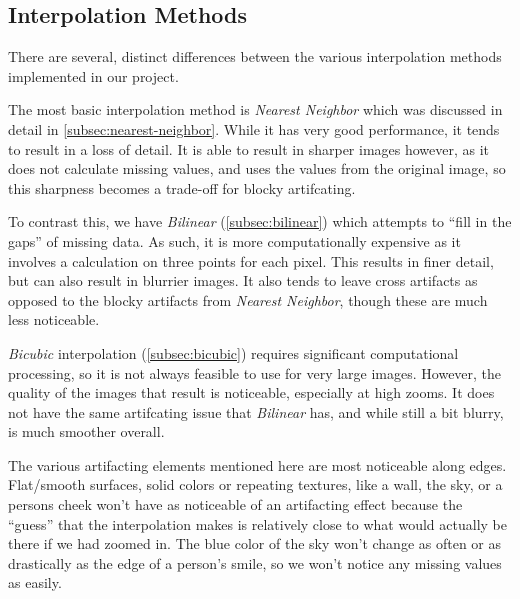 \subsection{Interpolation Methods}
There are several, distinct differences between the various interpolation methods implemented in our project.

The most basic interpolation method is \textit{Nearest Neighbor} which was discussed in detail in \autoref{subsec:nearest-neighbor}.
While it has very good performance, it tends to result in a loss of detail. It is able to result in sharper images however, as it does not calculate missing values, and uses the values from the original image, so this sharpness becomes a trade-off for blocky artifcating.

To contrast this, we have \textit{Bilinear} (\autoref{subsec:bilinear}) which attempts to ``fill in the gaps'' of missing data. As such, it is more computationally expensive as it involves a calculation on three points for each pixel. This results in finer detail, but can also result in blurrier images. It also tends to leave cross artifacts as opposed to the blocky artifacts from \textit{Nearest Neighbor}, though these are much less noticeable.

\textit{Bicubic} interpolation (\autoref{subsec:bicubic}) requires significant computational processing, so it is not always feasible to use for very large images. However, the quality of the images that result is noticeable, especially at high zooms. It does not have the same artifcating issue that \textit{Bilinear} has, and while still a bit blurry, is much smoother overall.

The various artifacting elements mentioned here are most noticeable along edges.  Flat/smooth surfaces, solid colors or repeating textures, like a wall, the sky, or a persons cheek won't have as noticeable of an artifacting effect because the ``guess'' that the interpolation makes is relatively close to what would actually be there if we had zoomed in.  The blue color of the sky won't change as often or as drastically as the edge of a person's smile, so we won't notice any missing values as easily.

